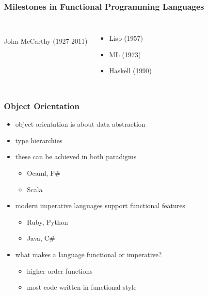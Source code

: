 \documentclass[dvipsnames]{beamer}
\theoremstyle{plain}
\begin{document}
\begin{frame}
  \frametitle{Milestones in Functional Programming Languages}

  \begin{columns}
    \begin{center}
      \\
      John McCarthy (1927-2011)
    \end{center}

    \begin{itemize}
      \item Lisp (1957)
      \item ML (1973)
      \item Haskell (1990)
    \end{itemize}
  \end{columns}
\end{frame}

\begin{frame}
  \frametitle{Object Orientation}

  \begin{itemize}
    \item object orientation is about data abstraction
    \item type hierarchies

    \medskip
    \item these can be achieved in both paradigms
    \begin{itemize}
      \item Ocaml, F\#
      \item Scala
    \end{itemize}
    \item modern imperative languages support functional features
    \begin{itemize}
      \item Ruby, Python
      \item Java, C\#
    \end{itemize}

    \pause
    \bigskip
    \item what makes a language functional or imperative?
    \begin{itemize}
      \item higher order functions
      \item most code written in functional style
    \end{itemize}
  \end{itemize}
\end{frame}
\end{document}
